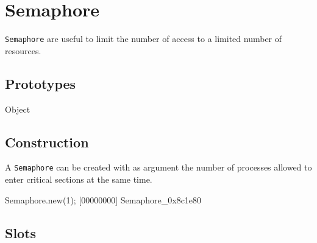 \section{Semaphore}

\lstinline|Semaphore| are useful to limit the number of access to a limited
number of resources.

\subsection{Prototypes}

\begin{refObjects}
\item[Object]
\end{refObjects}

\subsection{Construction}

A \lstinline|Semaphore| can be created with as argument the number of
processes allowed to enter critical sections at the same time.

\begin{urbiscript}[firstnumber=1]
Semaphore.new(1);
[00000000] Semaphore_0x8c1e80
\end{urbiscript}

\subsection{Slots}

